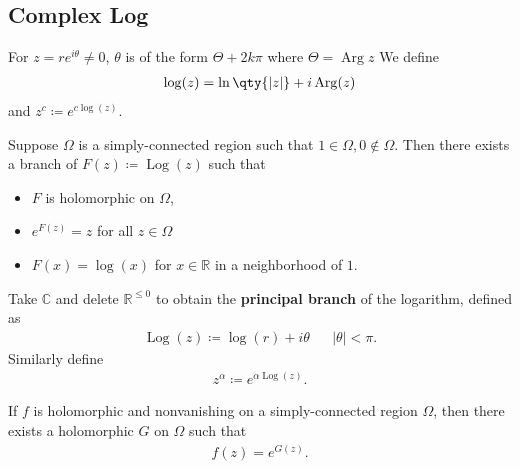 \hypertarget{complex-log}{%
\subsection{Complex Log}\label{complex-log}}

\begin{fact}

For \(z= r e^{i\theta}\neq 0\), \(\theta\) is of the form
\(\Theta + 2k\pi\) where \(\Theta = \operatorname{Arg}z\) We define
\begin{align*}
\log(z) = \ln\qty{{\left\lvert {z} \right\rvert}} + i\operatorname{Arg}(z)
\end{align*}
and \(z^c \coloneqq e^{c\log(z)}\).

\end{fact}

\begin{proposition}

Suppose \(\Omega\) is a simply-connected region such that
\(1\in \Omega, 0\not\in\Omega\). Then there exists a branch of
\(F(z) \coloneqq\operatorname{Log}(z)\) such that

\begin{itemize}
\tightlist
\item
  \(F\) is holomorphic on \(\Omega\),
\item
  \(e^{F(z)} = z\) for all \(z\in \Omega\)
\item
  \(F(x) = \log(x)\) for \(x\in {\mathbb{R}}\) in a neighborhood of
  \(1\).
\end{itemize}

\end{proposition}

\begin{definition}

Take \({\mathbb{C}}\) and delete \({\mathbb{R}}^{\leq 0}\) to obtain the
\textbf{principal branch} of the logarithm, defined as
\begin{align*}
\operatorname{Log}(z) \coloneqq\log(r) + i\theta && {\left\lvert {\theta} \right\rvert} < \pi
.\end{align*}
Similarly define
\begin{align*}
z^{\alpha} \coloneqq e^{\alpha \operatorname{Log}(z)}
.\end{align*}

\end{definition}

\begin{theorem}

If \(f\) is holomorphic and nonvanishing on a simply-connected region
\(\Omega\), then there exists a holomorphic \(G\) on \(\Omega\) such
that
\begin{align*}
f(z) = e^{G(z)}
.\end{align*}

\end{theorem}

